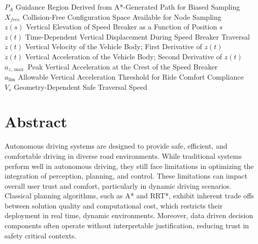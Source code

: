 \documentclass[a4paper,12pt,one side]{report}
\theoremstyle{definition}
\begin{document}
\begin{tabbing}
$P_A$                        \> Guidance Region Derived from A*-Generated Path for Biased Sampling \\[4pt]
$X_{free}$                   \> Collision-Free Configuration Space Available for Node Sampling \\[4pt]

$z(s)$                       \> Vertical Elevation of Speed Breaker as a Function of Position $s$ \\[4pt]
$z(t)$                       \> Time-Dependent Vertical Displacement During Speed Breaker Traversal \\[4pt]
$\dot{z}(t)$                 \> Vertical Velocity of the Vehicle Body; First Derivative of $z(t)$ \\[4pt]
$\ddot{z}(t)$                \> Vertical Acceleration of the Vehicle Body; Second Derivative of $z(t)$ \\[4pt]
$a_{z,\max}$                 \> Peak Vertical Acceleration at the Crest of the Speed Breaker \\[4pt]
$a_{\lim}$                   \> Allowable Vertical Acceleration Threshold for Ride Comfort Compliance \\[4pt]
$V_s$                        \> Geometry-Dependent Safe Traversal Speed \\[4pt]
\end{tabbing}








\newpage
{}
\chapter*{Abstract}
\justifying


Autonomous driving systems are designed to provide safe, efficient, and comfortable driving in diverse road environments. While traditional systems perform well in autonomous driving, they still face limitations in optimizing the integration of perception, planning, and control. These limitations can impact overall user trust and comfort, particularly in dynamic driving scenarios. Classical planning algorithms, such as A* and RRT*, exhibit inherent trade offs between solution quality and computational cost, which restricts their deployment in real time, dynamic environments. Moreover, data driven decision components often operate without interpretable justification, reducing trust in safety critical contexts.
\end{document}
